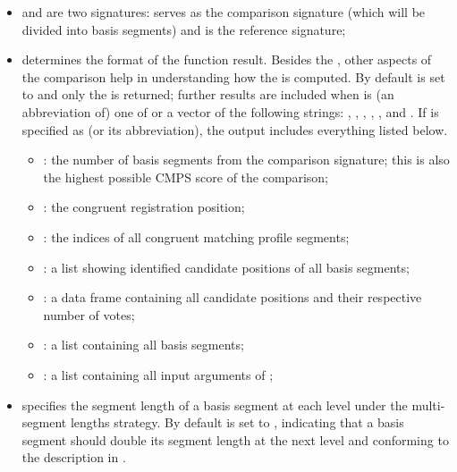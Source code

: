 \begin{itemize}
\item
   and  are two signatures:  serves as the
  comparison signature (which will be divided into basis segments) and
   is the reference signature;
\item
   determines the format of the function result. Besides
  the , other aspects of the comparison help in
  understanding how the  is computed. By default
   is set to  and only the 
  is returned; further results are included when  is (an
  abbreviation of) one of or a vector of the following strings:
  , , ,
  , , and . If
   is specified as  (or its
  abbreviation), the output includes everything listed below.

  \begin{itemize}
  \tightlist
  \item
    : the number of basis segments from the comparison
    signature; this is also the highest possible CMPS score of the
    comparison;
  \item
    : the congruent registration position;
  \item
    : the indices of all congruent matching
    profile segments;
  \item
    : a list showing identified candidate positions of
    all basis segments;
  \item
    : a data frame containing all candidate positions and
    their respective number of votes;
  \item
    : a list containing all basis segments;
  \item
    : a list containing all input arguments of
    ;
  \end{itemize}
\item
   specifies the segment length of a basis segment at
  each level under the multi-segment lengths strategy. By default
   is set to , indicating that a basis
  segment should double its segment length at the next level and
  conforming to the description in \citet{cmps} .
\end{itemize}

